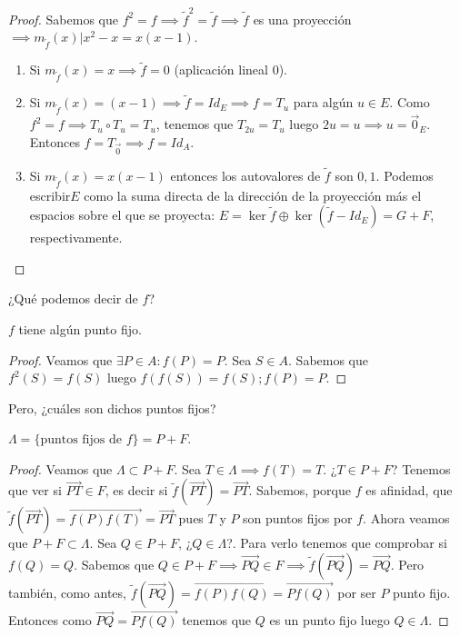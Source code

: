 \documentclass[14pt]{book}
\begin{document}
\begin{proof}
	Sabemos que $f^2 = f \implies \tilde{f}^2 = \tilde{f} \implies \tilde{f}$ es una proyección $\implies m_{\tilde{f}}(x) \vert x^2 - x = x(x - 1)$.  
	\begin{enumerate}
		\item Si $m_{\tilde{f}}(x) = x \implies \tilde{f} = 0$ (aplicación lineal 0).
		\item Si $m_{\tilde{f}}(x) = (x - 1) \implies \tilde{f} = Id_E \implies f = T_u$ para algún $u \in E$. Como $f^2 = f \implies T_u \circ T_u = T_u$, tenemos que $T_{2u} = T_u$ luego $2u = u \implies u = \vec{0}_E$. Entonces $f = T_{\vec{0}} \implies f = Id_A$.
		\item Si $m_{\tilde{f}}(x) = x(x - 1)$ entonces los autovalores de $\tilde{f}$ son $0, 1$. Podemos escribir$E$ como la suma directa de la dirección de la proyección más el espacios sobre el que se proyecta: $E = \ker \tilde{f} \oplus \ker (\tilde{f} - Id_E) = G + F$, respectivamente.
	\end{enumerate}
\end{proof}

¿Qué podemos decir de $f$?
\begin{pro}
	$f$ tiene algún punto fijo.
\end{pro}

\begin{proof}
	Veamos que $\exists P \in A : f(P) = P$. Sea $S \in A$. Sabemos que $f^2(S) = f(S)$ luego $f(f(S)) = f(S); f(P) = P$.
\end{proof}

Pero, ¿cuáles son dichos puntos fijos?
\begin{pro}
	$\Lambda = \{\text{puntos fijos de } f\} = P + F$.
\end{pro}

\begin{proof}
	Veamos que $\Lambda \subset P + F$. Sea $T \in \Lambda \implies f(T) = T$. ¿$T \in P + F$? Tenemos que ver si $\overrightarrow{PT} \in F$, es decir si $\tilde{f}(\overrightarrow{PT}) = \overrightarrow{PT}$. Sabemos, porque $f$ es afinidad, que $\tilde{f}(\overrightarrow{PT}) = \overrightarrow{f(P)f(T)} = \overrightarrow{PT}$ pues $T$ y $P$ son puntos fijos por $f$. Ahora veamos que $P + F \subset \Lambda$. Sea $Q \in P + F$, ¿$Q \in \Lambda$?. Para verlo tenemos que comprobar si $f(Q) = Q$. Sabemos que $Q \in P + F \implies \overrightarrow{PQ} \in F \implies \tilde{f}(\overrightarrow{PQ}) = \overrightarrow{PQ}$. Pero también, como antes, $\tilde{f}(\overrightarrow{PQ}) = \overrightarrow{f(P) f(Q)} = \overrightarrow{P f(Q)}$ por ser $P$ punto fijo. Entonces como $\overrightarrow{PQ} = \overrightarrow{P f(Q)}$ tenemos que $Q$ es un punto fijo luego $Q \in \Lambda$.
\end{proof}
\end{document}
